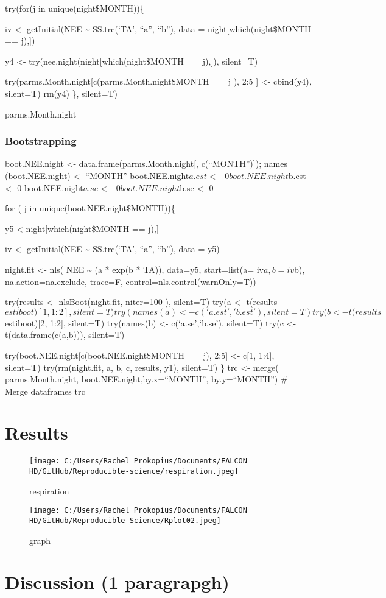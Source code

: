 \documentclass[
]{article}
\begin{document}
try(for(j in unique(night\$MONTH))\{

iv \textless- getInitial(NEE \textasciitilde{} SS.trc(`TA', ``a'',
``b''), data = night{[}which(night\$MONTH == j),{]})

y4 \textless- try(nee.night(night{[}which(night\$MONTH == j),{]}),
silent=T)

try(parms.Month.night{[}c(parms.Month.night\$MONTH == j ), 2:5 {]}
\textless- cbind(y4), silent=T) rm(y4) \}, silent=T)

parms.Month.night

\hypertarget{bootstrapping-1}{%
\subsubsection{Bootstrapping}\label{bootstrapping-1}}

boot.NEE.night \textless- data.frame(parms.Month.night{[},
c(``MONTH''){]}); names (boot.NEE.night) \textless- ``MONTH''
boot.NEE.night\(a.est <- 0 boot.NEE.night\)b.est \textless- 0
boot.NEE.night\(a.se <- 0 boot.NEE.night\)b.se \textless- 0

for ( j in unique(boot.NEE.night\$MONTH))\{

y5 \textless-night{[}which(night\$MONTH == j),{]}

iv \textless- getInitial(NEE \textasciitilde{} SS.trc(`TA', ``a'',
``b''), data = y5)

night.fit \textless- nls( NEE \textasciitilde{} (a * exp(b * TA)),
data=y5, start=list(a= iv\(a , b= iv\)b), na.action=na.exclude, trace=F,
control=nls.control(warnOnly=T))

try(results \textless- nlsBoot(night.fit, niter=100 ), silent=T) try(a
\textless-
t(results\(estiboot)[1, 1:2], silent=T)  try(names(a) <- c('a.est','b.est'), silent=T)  try(b <- t(results\)estiboot){[}2,
1:2{]}, silent=T) try(names(b) \textless- c(`a.se',`b.se'), silent=T)
try(c \textless- t(data.frame(c(a,b))), silent=T)

try(boot.NEE.night{[}c(boot.NEE.night\$MONTH == j), 2:5{]} \textless-
c{[}1, 1:4{]}, silent=T) try(rm(night.fit, a, b, c, results, y1),
silent=T) \} trc \textless- merge( parms.Month.night,
boot.NEE.night,by.x=``MONTH'', by.y=``MONTH'') \# Merge dataframes trc

\hypertarget{results}{%
\section{Results}\label{results}}

\begin{figure}
\centering
\texttt{[image: C:/Users/Rachel Prokopius/Documents/FALCON HD/GitHub/Reproducible-science/respiration.jpeg]}
\caption{respiration}
\end{figure}

\begin{figure}
\centering
\texttt{[image: C:/Users/Rachel Prokopius/Documents/FALCON HD/GitHub/Reproducible-Science/Rplot02.jpeg]}
\caption{graph}
\end{figure}

\hypertarget{discussion-1-paragrapgh}{%
\section{Discussion (1 paragrapgh)}\label{discussion-1-paragrapgh}}
\end{document}
